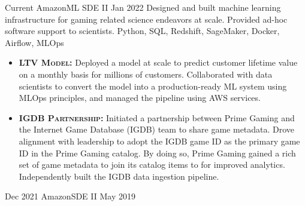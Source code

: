 \documentclass{cv}
\begin{document}
	\begin{experiences_env}
		\experienceWithProjects
			{Current}       {Amazon}{ML SDE II}
			{Jan 2022}      {
								Designed and built machine learning infrastructure for gaming related science endeavors at scale. Provided ad-hoc software support to scientists.
							}
							{Python, SQL, Redshift, SageMaker, Docker, Airflow, MLOps}
							{
								\begin{itemize}
									\item \textbf{\textsc{LTV Model:}} Deployed a model at scale to predict customer lifetime value on a monthly basis for millions of customers. Collaborated with data scientists to convert the model into a production-ready ML system using MLOps principles, and managed the pipeline using AWS services.
									\item \textbf{\textsc{IGDB Partnership:}} Initiated a partnership between Prime Gaming and the Internet Game Database (IGDB) team to share game metadata. Drove alignment with leadership to adopt the IGDB game ID as the primary game ID in the Prime Gaming catalog. By doing so, Prime Gaming gained a rich set of game metadata to join its catalog items to for improved analytics. Independently built the IGDB data ingestion pipeline.
								\end{itemize}
							}
		\emptySeparator
		\experienceWithProjects
			{Dec 2021}      {Amazon}{SDE II}
			{May 2019}      {

}
\end{experiences_env}
\end{document}
